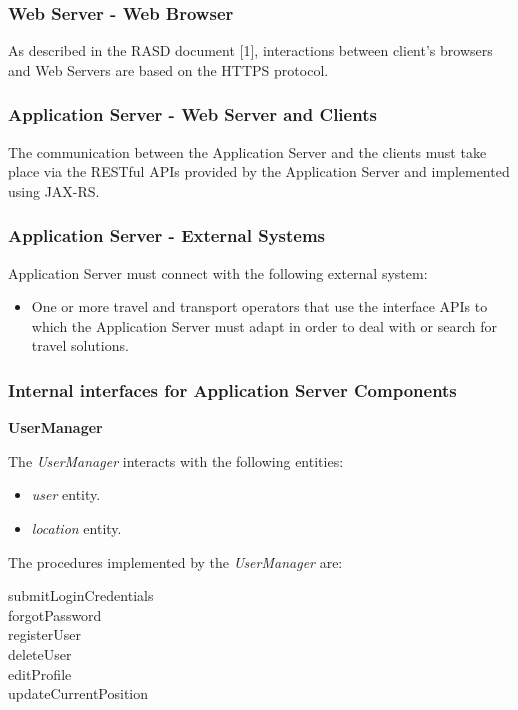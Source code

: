 \documentclass{article}
\begin{document}
	\subsubsection{Web Server - Web Browser}
	As described in the RASD document [1], interactions between client’s  browsers and Web Servers are based on the HTTPS protocol.


	\subsubsection{Application Server - Web Server and Clients}
	The communication between the Application Server and the clients must take place via the RESTful APIs provided by the Application Server and implemented using JAX-RS.


	\subsubsection{Application Server - External Systems}
	Application Server must connect with the following external system:
	\begin{itemize}
	\item One or more travel and transport operators that use the interface APIs to which the Application Server must adapt in order to deal with or search for travel solutions.
	\end{itemize}


	\subsubsection{Internal interfaces for Application Server Components}
	\bigskip
	\noindent
	\textbf{UserManager}
	
	\bigskip
	\noindent
	The \textit{UserManager} interacts with the following entities:
	\begin{itemize}
	\item \textit{user} entity.
	\item \textit{location} entity.
	\end{itemize}

	\bigskip
	The procedures implemented by the \textit{UserManager} are:
	\begin{description}
	\item [submitLoginCredentials]
	\item [forgotPassword]
	\item [registerUser]
	\item [deleteUser]
	\item [editProfile]
	\item [updateCurrentPosition]
	\end{description}
\end{document}
